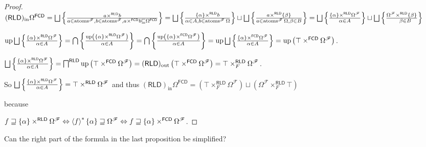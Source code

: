 \begin{proof}
  
  $(\mathsf{RLD})_{\operatorname{in}} \Omega^{\mathsf{FCD}} = \bigsqcup
  \setcond{ a \times^{\mathsf{RLD}} b }{ a \in
  \atoms^{\mathscr{F}}, b \in \atoms^{\mathscr{F}}, a
  \times^{\mathsf{FCD}} b \sqsubseteq \Omega^{\mathsf{FCD}}
  } = \bigsqcup \setcond{ \{ \alpha \} \times^{\mathsf{RLD}} b
  }{ \alpha \in A, b \in \atoms^{\mathscr{F}}
  \Omega } \sqcup \bigsqcup \setcond{ a \times^{\mathsf{RLD}} \{
  \beta \} }{ a \in \atoms^{\mathscr{F}}
  \Omega, \beta \in B } = \bigsqcup \setcond{ \{ \alpha \}
  \times^{\mathsf{RLD}} \Omega^{\mathscr{F}} }{
  \alpha \in A } \sqcup \bigsqcup \setcond{
  \Omega^{\mathscr{F}} \times^{\mathsf{RLD}} \{ \beta \} }{
  \hspace{1em} \beta \in B }$
  
  $\up \bigsqcup \setcond{ \{ \alpha \} \times^{\mathsf{RLD}}
  \Omega^{\mathscr{F}} }{ \alpha \in A } =
  \bigcap \setcond{ \up \left( \{ \alpha \} \times^{\mathsf{RLD}}
  \Omega^{\mathscr{F}} \right) }{ \alpha \in A
  } = \bigcap \setcond{ \up \left( \{ \alpha \}
  \times^{\mathsf{FCD}} \Omega^{\mathscr{F}} \right) }{
  \alpha \in A } = \up \bigsqcup \setcond{ \{ \alpha
  \} \times^{\mathsf{FCD}} \Omega^{\mathscr{F}} }{
  \alpha \in A } = \up \left( \top
  \times^{\mathsf{FCD}} \Omega^{\mathscr{F}} \right)$.
  
  $\bigsqcup \setcond{ \{ \alpha \} \times^{\mathsf{RLD}}
  \Omega^{\mathscr{F}} }{ \alpha \in A } =
  \bigsqcap^{\mathsf{RLD}} \up \left( \top
  \times^{\mathsf{FCD}} \Omega^{\mathscr{F}} \right) =
  (\mathsf{RLD})_{\operatorname{out}}  \left( \top \times^{\mathsf{FCD}}
  \Omega^{\mathscr{F}} \right) = \top \times^{\mathsf{RLD}}_F
  \Omega^{\mathscr{F}}$.
  
  So $\bigsqcup \setcond{ \{ \alpha \} \times^{\mathsf{RLD}}
  \Omega^{\mathscr{F}} }{ \alpha \in A } =
  \top \times^{\mathsf{RLD}} \Omega^{\mathscr{F}}$ and thus
  $(\mathsf{RLD})_{\operatorname{in}} \Omega^{\mathsf{FCD}} = \left(
  \top \times^{\mathsf{RLD}}_F \Omega^{\mathscr{F}} \right) \sqcup
  \left( \Omega^{\mathscr{F}} \times^{\mathsf{RLD}}_F \top \right)$
  
  because
  
  $f \sqsupseteq \{ \alpha \} \times^{\mathsf{RLD}}
  \Omega^{\mathscr{F}} \Leftrightarrow \left\langle f\right\rangle ^{\ast} \{ \alpha \}
  \sqsupseteq \Omega^{\mathscr{F}} \Leftrightarrow f \sqsupseteq \{ \alpha \}
  \times^{\mathsf{FCD}} \Omega^{\mathscr{F}}$.
\end{proof}

\begin{question}
  Can the right part of the formula in the last proposition be simplified?
\end{question}
